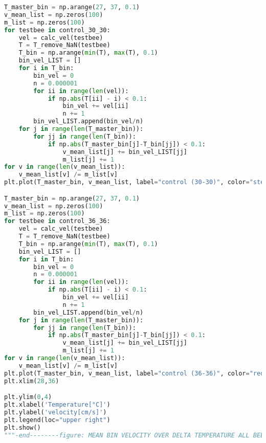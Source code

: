\begin{lstlisting}[language=Python, basicstyle=\tiny, frame=single, keywordstyle=\color{teal}, commentstyle=\color{olive}, stringstyle=\color{red}]
T_master_bin = np.arange(27, 37, 0.1)
v_mean_list = np.zeros(100)
m_list = np.zeros(100)
for testbee in control_30_30:
    vel = calc_vel(testbee)
    T = T_remove_NaN(testbee)
    T_bin = np.arange(min(T), max(T), 0.1)
    bin_vel_LIST = []
    for i in T_bin:
        bin_vel = 0
        n = 0.000001
        for ii in range(len(vel)):
            if np.abs(T[ii] - i) < 0.1:
                bin_vel += vel[ii]
                n += 1
        bin_vel_LIST.append(bin_vel/n)
    for j in range(len(T_master_bin)):
        for jj in range(len(T_bin)):
            if np.abs(T_master_bin[j]-T_bin[jj]) < 0.1:
                v_mean_list[j] += bin_vel_LIST[jj]
                m_list[j] += 1
for v in range(len(v_mean_list)):
    v_mean_list[v] /= m_list[v]
plt.plot(T_master_bin, v_mean_list, label="control (30-30)", color="steelblue", linestyle=(0, (3, 1, 1, 1, 1, 1)))

T_master_bin = np.arange(27, 37, 0.1)
v_mean_list = np.zeros(100)
m_list = np.zeros(100)
for testbee in control_36_36:
    vel = calc_vel(testbee)
    T = T_remove_NaN(testbee)
    T_bin = np.arange(min(T), max(T), 0.1)
    bin_vel_LIST = []
    for i in T_bin:
        bin_vel = 0
        n = 0.000001
        for ii in range(len(vel)):
            if np.abs(T[ii] - i) < 0.1:
                bin_vel += vel[ii]
                n += 1
        bin_vel_LIST.append(bin_vel/n)
    for j in range(len(T_master_bin)):
        for jj in range(len(T_bin)):
            if np.abs(T_master_bin[j]-T_bin[jj]) < 0.1:
                v_mean_list[j] += bin_vel_LIST[jj]
                m_list[j] += 1
for v in range(len(v_mean_list)):
    v_mean_list[v] /= m_list[v]
plt.plot(T_master_bin, v_mean_list, label="control (36-36)", color="red", linestyle=(0, (3, 1, 1, 1)))
plt.xlim(28,36)

plt.ylim(0,4)
plt.xlabel('Temperature[°C]')
plt.ylabel('velocity[cm/s]')
plt.legend(loc="upper right")
plt.show()
"""-end--------figure: MEAN BIN VELOCITY OVER DELTA TEMPERATURE ALL BEES-----"""


\end{lstlisting}